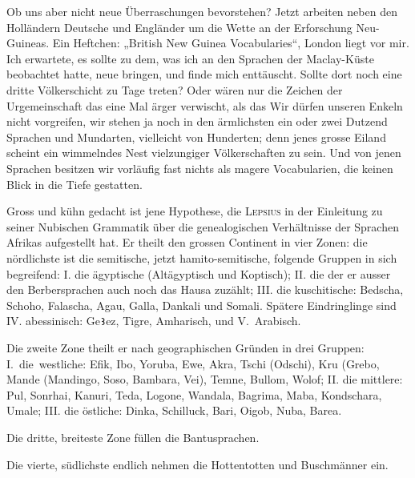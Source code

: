 {Ob uns aber nicht neue Überraschungen bevorstehen? Jetzt arbeiten neben den Holländern Deutsche und Engländer um die Wette an der Erforschung Neu-Guineas. Ein Heftchen: „British New Guinea Vocabularies“, London  liegt vor mir. Ich erwartete, es sollte zu dem, was ich an den Sprachen der Maclay-Küste beobachtet hatte, neue  bringen, und finde mich enttäuscht. Sollte dort noch eine dritte Völkerschicht zu Tage treten? Oder wären nur die Zeichen der Urgemeinschaft das eine Mal ärger verwischt, als das  Wir dürfen unseren Enkeln nicht vorgreifen, wir stehen ja noch in den ärmlichsten  ein oder zwei Dutzend Sprachen und Mundarten, vielleicht von Hunderten; denn jenes grosse Eiland scheint ein wimmelndes Nest vielzungiger Völkerschaften zu sein. Und von jenen Sprachen besitzen wir vorläufig fast nichts als magere Vocabularien, die keinen Blick in die Tiefe gestatten.

\label{sp.282}

Gross und kühn gedacht ist jene Hypothese, die \textsc{Lepsius} in der Einleitung zu seiner Nubischen Grammatik über die genealogischen Verhältnisse der Sprachen Afrikas aufgestellt hat. Er theilt den grossen Continent in vier Zonen: die nördlichste ist die semitische, jetzt hamito-semitische, folgende Gruppen in sich begreifend: I. die ägyptische (Altägyptisch und Koptisch); II. die  der er ausser den Berbersprachen auch noch das Hausa zuzählt; III. die kuschitische: Bedscha, Schoho, Falascha, Agau, Galla, Dankali und Somali. Spätere Eindringlinge sind  IV. abessinisch: Ge\texttt{Ꜣ}ez, Tigre, Amharisch,  und \mbox{V. Arabisch}.

\largerpage[1]Die zweite Zone theilt er nach geographischen Gründen in drei Gruppen: \linebreak\mbox{I. die westliche:} Efik, Ibo, Yoruba, Ewe, Akra, Tschi (Odschi), Kru (Grebo,  Mande (Mandingo, Soso, Bambara, Vei), Temne, Bullom, Wolof; II. die mittlere: Pul, Sonrhai, Kanuri, Teda, Logone, Wandala, Bagrima, Maba, Kondschara, Umale; III. die östliche: Dinka, Schilluck,  Bari, Oigob, Nuba, Barea.

Die dritte, breiteste Zone füllen die Bantusprachen.

Die vierte, südlichste endlich nehmen die Hottentotten und Buschmänner ein.

}
